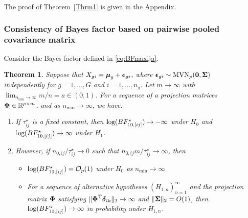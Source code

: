 \documentclass[alpha-refs]{wiley-article}
\theoremstyle{plain}%
\newtheorem{theorem}{Theorem}
\theoremstyle{definition}
\def\bzero{{\mathbf 0}}
\def\log{\hbox{log}}
\def\MVN{\hbox{MVN}}
\def\log{\hbox{log}}
\def\trans{^{\rm T}}
\def\bzero{{\mathbf 0}}
\newcommand{\bSigma}{\mbox{\boldmath $\Sigma$}}
\newcommand{\udelta}            {\mbox{\boldmath$\delta$}}
\newcommand{\uepsilon}          {\mbox{\boldmath$\epsilon$}}
\newcommand{\umu}               {\mbox{\boldmath$\mu$}}
\newcommand{\uSigma}            {\mbox{\boldmath$\Sigma$}}
\newcommand{\uPhi}              {\mbox{\boldmath$\Phi$}}
\begin{document}
The proof of Theorem~\ref{Thrm1} is given in the Appendix.

\subsubsection{Consistency of Bayes factor based on pairwise pooled covariance matrix}
Consider the Bayes factor defined in \eqref{eq:BFmaxija}. 
\begin{theorem}\label{Thrm2}
Suppose that $X_{gi} = \umu_g + \uepsilon_{gi}$, where $\uepsilon_{gi} \sim \MVN_{p}(\bzero, \uSigma)$ independently for $g = 1, \ldots, G$ and $i = 1,\ldots,n_g$. Let $m \rightarrow \infty$ with $ \lim_{n_{\min} \rightarrow \infty} m / n =  a \in  (0, 1)$. For a sequence of a projection matrices $\uPhi \in \mathbb{R}^{p \times m}$, and as $n_{\min} \rightarrow \infty$, we have:
\begin{enumerate}
    \item If $\tau^{\star}_{ij}$ is a fixed constant, 
    then $\log(BF^{\star}_{10, [ij]}) \rightarrow -\infty$ under $H_0$ and $\log(BF^{\star}_{10, [ij]}) \rightarrow \infty$ under $H_1$. 
    \item However, if $n_{0,ij}/\tau^{\star}_{ij} \rightarrow 0$ such that $n_{0,ij} m/\tau^{\star}_{ij} \rightarrow \infty$, then
    \begin{itemize}
     \item[(a)]  $\log(BF^{\star}_{10, [ij]}) = \mathcal{O}_{p}(1)$ under $H_0$ as $n_{\min} \rightarrow \infty$ 
     \item[(b)] 
     For a sequence of alternative hypotheses $(H_{1,n})_{n = 1}^\infty$ and the projection matrix $\uPhi$ satisfying $\|\uPhi\trans\udelta_{lk}\|_2\to\infty$ and $\|\bSigma\|_2 = O(1)$, then $\log(BF^{\star}_{10, [ij]}) \rightarrow \infty$ in probability under $H_{1,n}$. 
    \end{itemize}
\end{enumerate}
\end{theorem}
\end{document}
